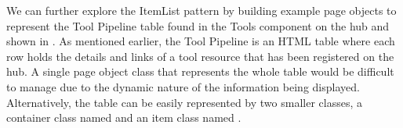 %
%
%


We can further explore the ItemList pattern by building example page objects to
represent the Tool Pipeline table found in the Tools component on the hub
and shown in .  As
mentioned earlier, the Tool Pipeline is an HTML table where each row holds the
details and links of a tool resource that has been registered on the hub.  A
single page object class that represents the whole table would be difficult to
manage due to the dynamic nature of the information being displayed.
Alternatively, the table can be easily represented by two smaller classes, a
container class named  and an item class named
.


